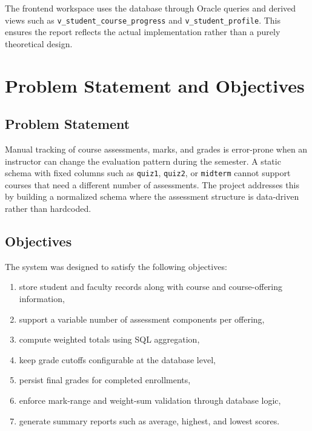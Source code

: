 \documentclass[12pt,a4paper]{report}
\begin{document}
The frontend workspace uses the database through Oracle queries and derived views such as \texttt{v\_student\_course\_progress} and \texttt{v\_student\_profile}. This ensures the report reflects the actual implementation rather than a purely theoretical design.

\chapter{Problem Statement and Objectives}

\section{Problem Statement}
Manual tracking of course assessments, marks, and grades is error-prone when an instructor can change the evaluation pattern during the semester. A static schema with fixed columns such as \texttt{quiz1}, \texttt{quiz2}, or \texttt{midterm} cannot support courses that need a different number of assessments. The project addresses this by building a normalized schema where the assessment structure is data-driven rather than hardcoded.

\section{Objectives}
The system was designed to satisfy the following objectives:
\begin{enumerate}[leftmargin=1.5em]
  \item store student and faculty records along with course and course-offering information,
  \item support a variable number of assessment components per offering,
  \item compute weighted totals using SQL aggregation,
  \item keep grade cutoffs configurable at the database level,
  \item persist final grades for completed enrollments,
  \item enforce mark-range and weight-sum validation through database logic,
  \item generate summary reports such as average, highest, and lowest scores.
\end{enumerate}
\end{document}
